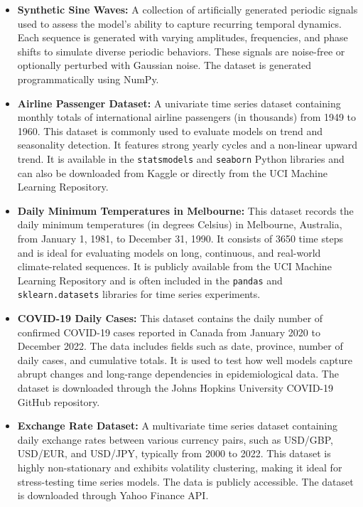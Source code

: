 \documentclass[conference]{IEEEtran}
\begin{document}
\begin{itemize}
    \item \textbf{Synthetic Sine Waves:} A collection of artificially generated periodic signals used to assess the model's ability to capture recurring temporal dynamics. Each sequence is generated with varying amplitudes, frequencies, and phase shifts to simulate diverse periodic behaviors. These signals are noise-free or optionally perturbed with Gaussian noise. The dataset is generated programmatically using NumPy.

    \item \textbf{Airline Passenger Dataset:} A univariate time series dataset containing monthly totals of international airline passengers (in thousands) from 1949 to 1960. This dataset is commonly used to evaluate models on trend and seasonality detection. It features strong yearly cycles and a non-linear upward trend. It is available in the \texttt{statsmodels} and \texttt{seaborn} Python libraries and can also be downloaded from Kaggle or directly from the UCI Machine Learning Repository.

    \item \textbf{Daily Minimum Temperatures in Melbourne:} This dataset records the daily minimum temperatures (in degrees Celsius) in Melbourne, Australia, from January 1, 1981, to December 31, 1990. It consists of 3650 time steps and is ideal for evaluating models on long, continuous, and real-world climate-related sequences. It is publicly available from the UCI Machine Learning Repository and is often included in the \texttt{pandas} and \texttt{sklearn.datasets} libraries for time series experiments.

    \item \textbf{COVID-19 Daily Cases:} This dataset contains the daily number of confirmed COVID-19 cases reported in Canada from January 2020 to December 2022. The data includes fields such as date, province, number of daily cases, and cumulative totals. It is used to test how well models capture abrupt changes and long-range dependencies in epidemiological data. The dataset is downloaded through the Johns Hopkins University COVID-19 GitHub repository.

    \item \textbf{Exchange Rate Dataset:} A multivariate time series dataset containing daily exchange rates between various currency pairs, such as USD/GBP, USD/EUR, and USD/JPY, typically from 2000 to 2022. This dataset is highly non-stationary and exhibits volatility clustering, making it ideal for stress-testing time series models. The data is publicly accessible. The dataset is downloaded through Yahoo Finance API.
    

\end{itemize}
\end{document}
